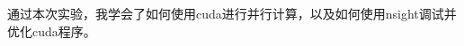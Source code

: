 \documentclass{ctexart}
\begin{document}
\begin{sloppypar}
通过本次实验，我学会了如何使用cuda进行并行计算，以及如何使用nsight调试并优化cuda程序。

\end{sloppypar}
\end{document}

